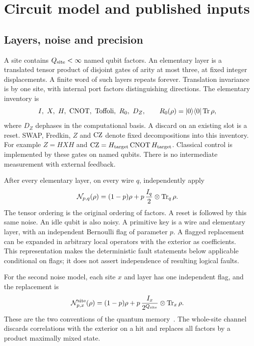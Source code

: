 \section{Circuit model and published inputs}\label{sec:model}
\subsection{Layers, noise and precision}\label{sec:precision}
A site contains $Q_{\rm site}<\infty$ named qubit factors. An elementary layer is a translated tensor product of disjoint gates of arity at most three, at fixed integer displacements. A finite word of such layers repeats forever. Translation invariance is by one site, with internal port factors distinguishing directions. The elementary inventory is
\[
 I,\ X,\ H,\ \operatorname{CNOT},\ \operatorname{Toffoli},\ R_0,\ D_Z,
 \qquad R_0(\rho)=\lvert 0\rangle\langle 0\rvert\operatorname{Tr}\rho,
\]
where $D_Z$ dephases in the computational basis. A discard on an existing slot is a reset. SWAP, Fredkin, $Z$ and $\operatorname{CZ}$ denote fixed decompositions into this inventory. For example $Z=HXH$ and $\operatorname{CZ}=H_{\rm target}\operatorname{CNOT} H_{\rm target}$. Classical control is implemented by these gates on named qubits. There is no intermediate measurement with external feedback.

After every elementary layer, on every wire $q$, independently apply
\begin{equation}\label{eq:wire-noise}
 \mathcal N_{p,q}(\rho)=(1-p)\rho+
 p\,\frac{I_q}{2}\otimes\operatorname{Tr}_q\rho.
\end{equation}
The tensor ordering is the original ordering of factors. A reset is followed by this same noise. An idle qubit is also noisy. A primitive key is a wire and elementary layer, with an independent Bernoulli flag of parameter $p$. A flagged replacement can be expanded in arbitrary local operators with the exterior as coefficients. This representation makes the deterministic fault statements below applicable conditional on flags; it does not assert independence of resulting logical faults.

For the second noise model, each site $x$ and layer has one independent flag, and the replacement is
\begin{equation}\label{eq:site-noise}
 \mathcal N^{\rm site}_{p,x}(\rho)=(1-p)\rho+
 p\,\frac{I_x}{2^{Q_{\rm site}}}\otimes\operatorname{Tr}_x\rho.
\end{equation}
These are the two conventions of the quantum memory~\cite[Section~2.2]{DMMemory2026}. The whole-site channel discards correlations with the exterior on a hit and replaces all factors by a product maximally mixed state.

